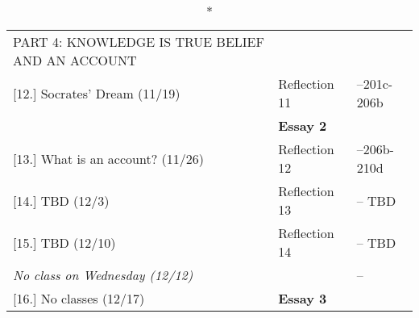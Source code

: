 \documentclass[article,oneside]{memoir}
\begin{document}
\vspace{-1.5cm}
\begin{center}
\begin{longtable}{p{6cm}p{3cm}p{5cm}}
  \caption*{PART 4: KNOWLEDGE IS TRUE BELIEF AND AN ACCOUNT} \\
  			

[12.] Socrates' Dream (11/19)			& Reflection 11		& --201c-206b \\
								& \textbf{Essay 2}	&  \\

						
[13.] What is an account? (11/26)	      	& Reflection 12		&  --206b-210d \\ 

[14.] TBD  (12/3)	    				& Reflection 13 	& -- TBD\\ 
			      				
[15.] TBD 	(12/10)			  		& Reflection 14		&-- TBD \\ 
\emph{No class on Wednesday (12/12)}   &	 			&--\\ 

[16.] No classes (12/17)		    		& \textbf{Essay 3}		& \\ 



\end{longtable}
\end{center}



\end{document}
